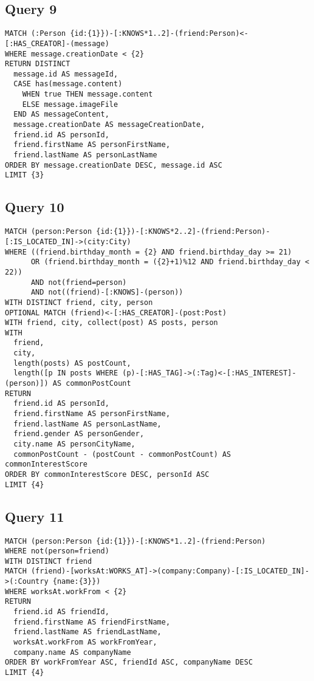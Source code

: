 \subsection{Query 9}

{\footnotesize
\begin{verbatim}
MATCH (:Person {id:{1}})-[:KNOWS*1..2]-(friend:Person)<-[:HAS_CREATOR]-(message)
WHERE message.creationDate < {2}
RETURN DISTINCT 
  message.id AS messageId, 
  CASE has(message.content) 
    WHEN true THEN message.content 
    ELSE message.imageFile 
  END AS messageContent,
  message.creationDate AS messageCreationDate, 
  friend.id AS personId, 
  friend.firstName AS personFirstName, 
  friend.lastName AS personLastName
ORDER BY message.creationDate DESC, message.id ASC
LIMIT {3}
\end{verbatim}
}

\subsection{Query 10}

{\footnotesize
\begin{verbatim}
MATCH (person:Person {id:{1}})-[:KNOWS*2..2]-(friend:Person)-[:IS_LOCATED_IN]->(city:City)
WHERE ((friend.birthday_month = {2} AND friend.birthday_day >= 21) 
      OR (friend.birthday_month = ({2}+1)%12 AND friend.birthday_day < 22)) 
      AND not(friend=person) 
      AND not((friend)-[:KNOWS]-(person))
WITH DISTINCT friend, city, person
OPTIONAL MATCH (friend)<-[:HAS_CREATOR]-(post:Post)
WITH friend, city, collect(post) AS posts, person
WITH 
  friend, 
  city, 
  length(posts) AS postCount, 
  length([p IN posts WHERE (p)-[:HAS_TAG]->(:Tag)<-[:HAS_INTEREST]-(person)]) AS commonPostCount
RETURN 
  friend.id AS personId, 
  friend.firstName AS personFirstName, 
  friend.lastName AS personLastName, 
  friend.gender AS personGender, 
  city.name AS personCityName, 
  commonPostCount - (postCount - commonPostCount) AS commonInterestScore
ORDER BY commonInterestScore DESC, personId ASC
LIMIT {4}
\end{verbatim}
}

\subsection{Query 11}

{\footnotesize
\begin{verbatim}
MATCH (person:Person {id:{1}})-[:KNOWS*1..2]-(friend:Person)
WHERE not(person=friend)
WITH DISTINCT friend
MATCH (friend)-[worksAt:WORKS_AT]->(company:Company)-[:IS_LOCATED_IN]->(:Country {name:{3}})
WHERE worksAt.workFrom < {2}
RETURN 
  friend.id AS friendId, 
  friend.firstName AS friendFirstName, 
  friend.lastName AS friendLastName, 
  worksAt.workFrom AS workFromYear, 
  company.name AS companyName
ORDER BY workFromYear ASC, friendId ASC, companyName DESC
LIMIT {4}
\end{verbatim}
}

